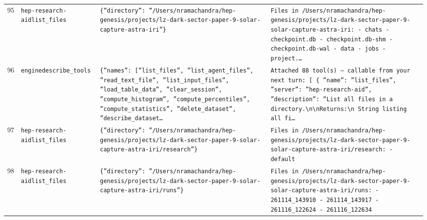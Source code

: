 \documentclass[11pt,a4paper]{article}
\begin{document}
\begin{longtable}{@{}p{}p{}p{}p{}@{}}
95 & \texttt{hep-research-aid}\newline\texttt{list\_\allowbreak{}files} & \texttt{\{''directory'':\allowbreak{} ''/\allowbreak{}Users/\allowbreak{}nramachandra/\allowbreak{}hep-genesis/\allowbreak{}projects/\allowbreak{}lz-dark-sector-paper-9-solar-capture-astra-iri''\}\allowbreak{}} & \texttt{Files in /\allowbreak{}Users/\allowbreak{}nramachandra/\allowbreak{}hep-genesis/\allowbreak{}projects/\allowbreak{}lz-dark-sector-paper-9-solar-capture-astra-iri:\allowbreak{}   - chats   - checkpoint.db   - checkpoint.db-shm   - checkpoint.db-wal   - data   - jobs   - project.\ldots{}\allowbreak{}} \\
96 & \texttt{engine}\newline\texttt{describe\_\allowbreak{}tools} & \texttt{\{''names'':\allowbreak{} [''list\_\allowbreak{}files'',\allowbreak{} ''list\_\allowbreak{}agent\_\allowbreak{}files'',\allowbreak{} ''read\_\allowbreak{}text\_\allowbreak{}file'',\allowbreak{} ''list\_\allowbreak{}input\_\allowbreak{}files'',\allowbreak{} ''load\_\allowbreak{}table\_\allowbreak{}data'',\allowbreak{} ''clear\_\allowbreak{}session'',\allowbreak{} ''compute\_\allowbreak{}histogram'',\allowbreak{} ''compute\_\allowbreak{}percentiles'',\allowbreak{} ''compute\_\allowbreak{}statistics'',\allowbreak{} ''delete\_\allowbreak{}dataset'',\allowbreak{} ''describe\_\allowbreak{}dataset\ldots{}\allowbreak{}} & \texttt{Attached 88 tool(s)\allowbreak{} --- callable from your next turn:\allowbreak{} [  \{   ''name'':\allowbreak{} ''list\_\allowbreak{}files'',\allowbreak{}   ''server'':\allowbreak{} ''hep-research-aid'',\allowbreak{}   ''description'':\allowbreak{} ''List all files in a directory.\textbackslash{}\allowbreak{}n\textbackslash{}\allowbreak{}nReturns:\allowbreak{}\textbackslash{}\allowbreak{}n    String listing all fi\ldots{}\allowbreak{}} \\
97 & \texttt{hep-research-aid}\newline\texttt{list\_\allowbreak{}files} & \texttt{\{''directory'':\allowbreak{} ''/\allowbreak{}Users/\allowbreak{}nramachandra/\allowbreak{}hep-genesis/\allowbreak{}projects/\allowbreak{}lz-dark-sector-paper-9-solar-capture-astra-iri/\allowbreak{}research''\}\allowbreak{}} & \texttt{Files in /\allowbreak{}Users/\allowbreak{}nramachandra/\allowbreak{}hep-genesis/\allowbreak{}projects/\allowbreak{}lz-dark-sector-paper-9-solar-capture-astra-iri/\allowbreak{}research:\allowbreak{}   - default} \\
98 & \texttt{hep-research-aid}\newline\texttt{list\_\allowbreak{}files} & \texttt{\{''directory'':\allowbreak{} ''/\allowbreak{}Users/\allowbreak{}nramachandra/\allowbreak{}hep-genesis/\allowbreak{}projects/\allowbreak{}lz-dark-sector-paper-9-solar-capture-astra-iri/\allowbreak{}runs''\}\allowbreak{}} & \texttt{Files in /\allowbreak{}Users/\allowbreak{}nramachandra/\allowbreak{}hep-genesis/\allowbreak{}projects/\allowbreak{}lz-dark-sector-paper-9-solar-capture-astra-iri/\allowbreak{}runs:\allowbreak{}   - 261114\_\allowbreak{}143910   - 261114\_\allowbreak{}143917   - 261116\_\allowbreak{}122624   - 261116\_\allowbreak{}122634} \\

\end{longtable}
\end{document}
